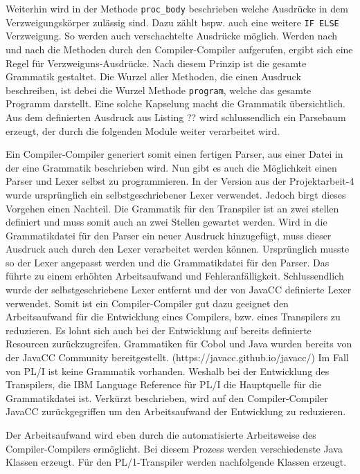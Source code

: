Weiterhin wird in der Methode \verb+proc_body+ beschrieben welche Ausdrücke in dem Verzweigungskörper zulässig sind. Dazu zählt bspw. auch eine weitere \verb+IF ELSE+ Verzweigung. So werden auch verschachtelte Ausdrücke möglich.
Werden nach und nach die Methoden durch den Compiler-Compiler aufgerufen, ergibt sich eine Regel für Verzweiguns-Ausdrücke. Nach diesem Prinzip ist die gesamte Grammatik gestaltet. 
Die Wurzel aller Methoden, die einen Ausdruck beschreiben, ist debei die Wurzel Methode \verb+program+, welche das gesamte Programm darstellt. Eine solche Kapselung macht die Grammatik übersichtlich.
Aus dem definierten Ausdruck aus Listing ?? wird schlussendlich ein Parsebaum erzeugt, der durch die folgenden Module weiter verarbeitet wird.


Ein Compiler-Compiler generiert somit einen fertigen Parser, aus einer Datei in der eine Grammatik beschrieben wird. Nun gibt es auch die Möglichkeit einen Parser und Lexer selbst zu programmieren. In der Version aus der Projektarbeit-4 wurde ursprünglich ein selbstgeschriebener Lexer verwendet.
Jedoch birgt dieses Vorgehen einen Nachteil. Die Grammatik für den Transpiler ist an zwei stellen definiert und muss somit auch an zwei Stellen gewartet werden.
Wird in die Grammatikdatei für den Parser ein neuer Ausdruck hinzugefügt, muss dieser Ausdruck auch durch den Lexer verarbeitet werden können.
Ursprünglich musste so der Lexer angepasst werden und die Grammatikdatei für den Parser. 
Das führte zu einem erhöhten Arbeitsaufwand und Fehleranfälligkeit. Schlussendlich wurde der selbstgeschriebene Lexer entfernt und der von JavaCC definierte Lexer verwendet.
Somit ist ein Compiler-Compiler gut dazu geeignet den Arbeitsaufwand für die Entwicklung eines Compilers, bzw. eines Transpilers zu reduzieren. 
Es lohnt sich auch bei der Entwicklung auf bereits definierte Resourcen zurückzugreifen. 
Grammatiken für Cobol und Java wurden bereits von der JavaCC Community bereitgestellt. (https://javacc.github.io/javacc/)
Im Fall von PL/I ist keine Grammatik vorhanden. Weshalb bei der Entwicklung des Transpilers, die IBM Language Reference für PL/I die Hauptquelle für die Grammatikdatei ist.  
Verkürzt beschrieben, wird auf den Compiler-Compiler JavaCC zurückgegriffen um den Arbeitsaufwand der Entwicklung zu reduzieren. 

Der Arbeitsaufwand wird eben durch die automatisierte Arbeitsweise des Compiler-Compilers ermöglicht. Bei diesem Prozess werden verschiedenste Java Klassen erzeugt. Für den PL/1-Transpiler werden nachfolgende Klassen erzeugt.

